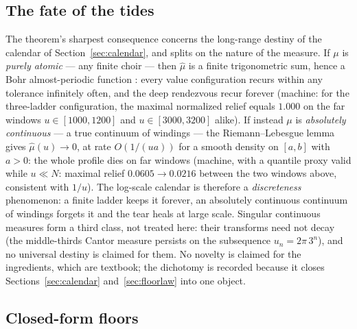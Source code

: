 \documentclass[11pt,a4paper]{article}
\begin{document}
\subsection{The fate of the tides}
\label{sec:tides}

The theorem's sharpest consequence concerns the long-range destiny of
the calendar of Section~\ref{sec:calendar}, and splits on the nature of
the measure. If $\mu$ is \emph{purely atomic} --- any finite choir ---
then $\hat{\mu}$ is a finite trigonometric sum, hence a Bohr
almost-periodic function \cite{Bohr1947}: every value configuration
recurs within any tolerance infinitely often, and the deep rendezvous
recur forever (machine: for the three-ladder configuration, the maximal
normalized relief equals $1.000$ on the far windows $u \in [1000,1200]$
and $u \in [3000,3200]$ alike). If instead $\mu$ is \emph{absolutely
continuous} --- a true continuum of windings --- the Riemann--Lebesgue
lemma gives $\hat{\mu}(u) \to 0$, at rate $O(1/(ua))$ for a smooth
density on $[a,b]$ with $a > 0$: the whole profile dies on far windows
(machine, with a quantile proxy valid while $u \ll N$: maximal relief
$0.0605 \to 0.0216$ between the two windows above, consistent with
$1/u$). The log-scale calendar is therefore a \emph{discreteness}
phenomenon: a finite ladder keeps it forever, an absolutely continuous
continuum of windings forgets it and the tear heals at large scale. Singular
continuous measures form a third class, not treated here: their transforms
need not decay (the middle-thirds Cantor measure persists on the subsequence
$u_n = 2\pi\,3^n$), and no universal destiny is claimed for them. No novelty
is claimed for
the ingredients, which are textbook; the dichotomy is recorded because
it closes Sections~\ref{sec:calendar} and~\ref{sec:floorlaw} into one
object.

\subsection{Closed-form floors}
\label{sec:closedfloors}
\end{document}
